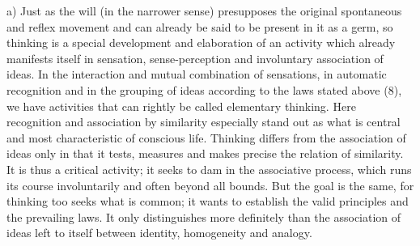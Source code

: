 \documentclass[12pt,a4paper]{book}
\newcommand{\opage}[1]{\marginnote{\footnotesize\textit{[#1]}}}
\begin{document}
\opage{211}a) Just as the will (in the narrower sense) presupposes the
original spontaneous and reflex movement and can already be said to be
present in it as a germ, so thinking is a special development and
elaboration of an activity which already manifests itself in sensation,
sense-perception and involuntary association of ideas. In the
interaction and mutual combination of sensations, in automatic
recognition and in the grouping of ideas according to the laws stated
above (8), we have activities that can rightly be called elementary
thinking. Here recognition and association by similarity especially
stand out as what is central and most characteristic of conscious life.
Thinking differs from the association of ideas only in that it tests,
measures and makes precise the relation of similarity. It is thus a
critical activity; it seeks to dam in the associative process, which
runs its course involuntarily and often beyond all bounds. But the goal
is the same, for thinking too seeks what is common; it wants to
establish the valid principles and the prevailing laws. It only
distinguishes more definitely than the association of ideas left to
itself between identity, homogeneity and analogy.
\end{document}
